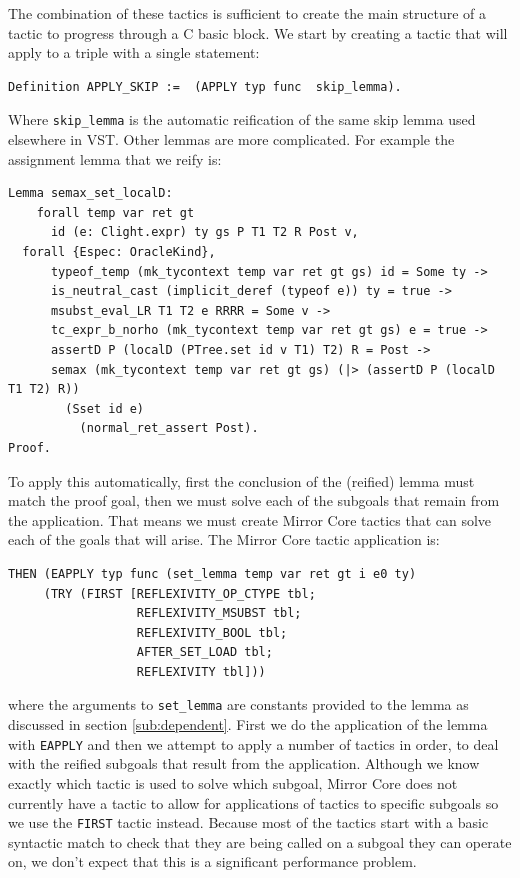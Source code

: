 \documentclass{puthesis}
\begin{document}
The combination of these tactics is sufficient to create the main
structure of a tactic to progress through a C basic block. We start by
creating a tactic that will apply to a triple with a single statement:

\begin{lstlisting}
Definition APPLY_SKIP :=  (APPLY typ func  skip_lemma).
\end{lstlisting}

Where \lstinline|skip_lemma| is the automatic reification of the same
skip lemma used elsewhere in VST. Other lemmas are more
complicated. For example the assignment lemma that we reify is:

\begin{lstlisting}
Lemma semax_set_localD:
    forall temp var ret gt 
      id (e: Clight.expr) ty gs P T1 T2 R Post v,
  forall {Espec: OracleKind},
      typeof_temp (mk_tycontext temp var ret gt gs) id = Some ty -> 
      is_neutral_cast (implicit_deref (typeof e)) ty = true ->
      msubst_eval_LR T1 T2 e RRRR = Some v ->
      tc_expr_b_norho (mk_tycontext temp var ret gt gs) e = true ->
      assertD P (localD (PTree.set id v T1) T2) R = Post ->
      semax (mk_tycontext temp var ret gt gs) (|> (assertD P (localD T1 T2) R))
        (Sset id e)
          (normal_ret_assert Post).
Proof.
\end{lstlisting}

To apply this automatically, first the conclusion of the (reified)
lemma must match the proof goal, then we must solve each of the
subgoals that remain from the application. That means we must create
Mirror Core tactics that can solve each of the goals that will
arise. The Mirror Core tactic application is:

\begin{lstlisting}
THEN (EAPPLY typ func (set_lemma temp var ret gt i e0 ty)
     (TRY (FIRST [REFLEXIVITY_OP_CTYPE tbl;
                  REFLEXIVITY_MSUBST tbl; 
                  REFLEXIVITY_BOOL tbl;
                  AFTER_SET_LOAD tbl;
                  REFLEXIVITY tbl]))
\end{lstlisting}

where the arguments to \lstinline|set_lemma| are constants provided to
the lemma as discussed in section \ref{sub:dependent}. %
First we do the application of the lemma with \lstinline|EAPPLY| and
then we attempt to apply a number of tactics in order, to deal with
the reified subgoals that result from the application. Although we
know exactly which tactic is used to solve which subgoal, Mirror Core
does not currently have a tactic to allow for applications of tactics
to specific subgoals so we use the \lstinline|FIRST| tactic
instead. Because most of the tactics start with a basic syntactic
match to check that they are being called on a subgoal they can
operate on, we don't expect that this is a significant performance
problem.
\end{document}
